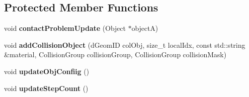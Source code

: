 \subsection*{Protected Member Functions}
\begin{DoxyCompactItemize}
\item 
\mbox{\label{classraisim_1_1World_a6460101a7897c53b3c54d5ace3e61867}} 
void {\bfseries contact\+Problem\+Update} (Object $\ast$objectA)
\item 
\mbox{\label{classraisim_1_1World_a25967bbfe434c30d269292883a214b05}} 
void {\bfseries add\+Collision\+Object} (d\+Geom\+ID col\+Obj, size\+\_\+t local\+Idx, const std\+::string \&material, Collision\+Group collision\+Group, Collision\+Group collision\+Mask)
\item 
\mbox{\label{classraisim_1_1World_afa7b83042cbcbc66d98ccacb9386664e}} 
void {\bfseries update\+Obj\+Confiig} ()
\item 
\mbox{\label{classraisim_1_1World_a43fbcc6430ac26aeceb0e307a7992b5b}} 
void {\bfseries update\+Step\+Count} ()
\end{DoxyCompactItemize}
